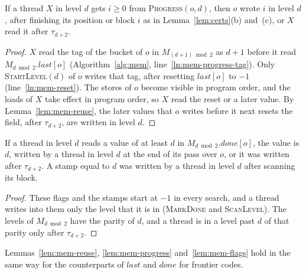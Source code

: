 \begin{lemma}[Progress]
\label{lem:mem-progress}
If a thread $X$ in level $d$ gets $i \geq 0$ from \textsc{Progress}$(o, d)$, then $o$ wrote $i$ in level $d$, after finishing its position or block $i$ as in Lemma~\ref{lem:certs}(b) and~(c), or $X$ read it after $\tau_{d+2}$.
\end{lemma}
\begin{proof}
$X$ read the tag of the bucket of $o$ in $M_{(d+1) \bmod 2}$ as $d+1$ before it read $M_{d \bmod 2}.\mathit{last}[o]$ (Algorithm~\ref{alg:mem}, line~\ref{ln:mem-progress-tag}). Only \textsc{StartLevel}$(d)$ of $o$ writes that tag, after resetting $\mathit{last}[o]$ to $-1$ (line~\ref{ln:mem-reset}). The stores of $o$ become visible in program order, and the loads of $X$ take effect in program order, so $X$ read the reset or a later value. By Lemma~\ref{lem:mem-reuse}, the later values that $o$ writes before it next resets the field, after $\tau_{d+2}$, are written in level $d$.
\end{proof}

\begin{lemma}
\label{lem:mem-flags}
If a thread in level $d$ reads a value of at least $d$ in $M_{d \bmod 2}.\mathit{done}[o]$, the value is $d$, written by a thread in level $d$ at the end of its pass over $o$, or it was written after $\tau_{d+2}$. A stamp equal to $d$ was written by a thread in level $d$ after scanning its block.
\end{lemma}
\begin{proof}
These flags and the stamps start at $-1$ in every search, and a thread writes into them only the level that it is in (\textsc{MarkDone} and \textsc{ScanLevel}). The levels of $M_{d \bmod 2}$ have the parity of $d$, and a thread is in a level past $d$ of that parity only after $\tau_{d+2}$.
\end{proof}
Lemmas~\ref{lem:mem-reuse}, \ref{lem:mem-progress} and~\ref{lem:mem-flags} hold in the same way for the counterparts of $\mathit{last}$ and $\mathit{done}$ for frontier codes.


